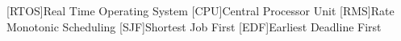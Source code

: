 [RTOS]{Real Time Operating System}
[CPU]{Central Processor Unit}
[RMS]{Rate Monotonic Scheduling}
[SJF]{Shortest Job First}
[EDF]{Earliest Deadline First}